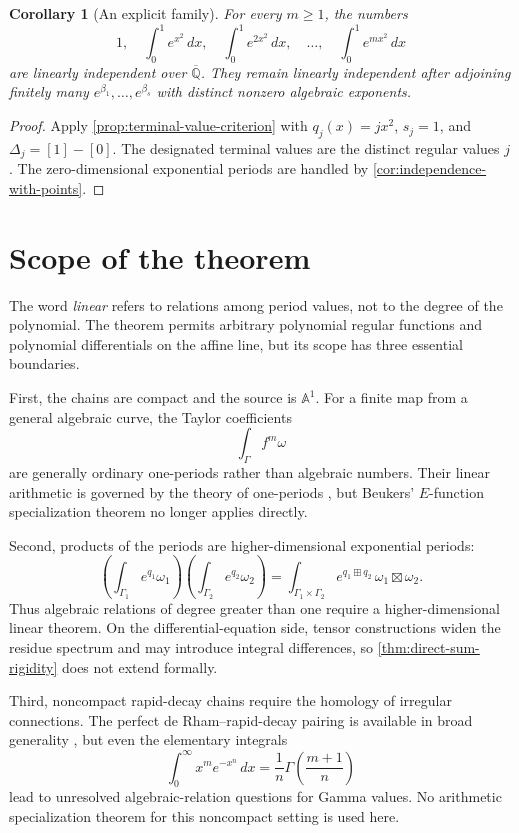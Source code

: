 \documentclass[11pt]{article}
\numberwithin{equation}{section}
\newtheorem{corollary}[corollary]{Corollary}
\theoremstyle{definition}
\theoremstyle{remark}
\newcommand{\Qbar}{\overline{\mathbb Q}}
\newcommand{\Aone}{\mathbb A^1}
\begin{document}
\begin{corollary}[An explicit family]
\label{cor:explicit-family}
For every $m\ge1$, the numbers
\[
  1,
  \quad
  \int_0^1e^{x^2}\,dx,
  \quad
  \int_0^1e^{2x^2}\,dx,
  \quad\ldots,\quad
  \int_0^1e^{mx^2}\,dx
\]
are linearly independent over $\Qbar$.  They remain linearly independent
after adjoining finitely many $e^{\beta_1},\ldots,e^{\beta_s}$ with
distinct nonzero algebraic exponents.
\end{corollary}

\begin{proof}
Apply \cref{prop:terminal-value-criterion} with
$q_j(x)=jx^2$, $s_j=1$, and $\Delta_j=[1]-[0]$.  The designated terminal
values are the distinct regular values $j$.  The zero-dimensional exponential periods are handled
by \cref{cor:independence-with-points}.
\end{proof}

\section{Scope of the theorem}
\label{sec:scope}

The word \emph{linear} refers to relations among period values, not to the
degree of the polynomial.  The theorem permits arbitrary polynomial
regular functions and polynomial differentials on the affine line, but its
scope has three essential boundaries.

First, the chains are compact and the source is $\Aone$.  For a finite map
from a general algebraic curve, the Taylor coefficients
\[
  \int_\Gamma f^m\omega
\]
are generally ordinary one-periods rather than algebraic numbers.  Their
linear arithmetic is governed by the theory of one-periods
\cite{HuberWustholz}, but Beukers' $E$-function specialization theorem no
longer applies directly.

Second, products of the periods are higher-dimensional exponential periods:
\[
  \left(\int_{\Gamma_1}e^{q_1}\omega_1\right)
  \left(\int_{\Gamma_2}e^{q_2}\omega_2\right)
  =\int_{\Gamma_1\times\Gamma_2}
     e^{q_1\boxplus q_2}\,\omega_1\boxtimes\omega_2.
\]
Thus algebraic relations of degree greater than one require a
higher-dimensional linear theorem.  On the differential-equation side,
tensor constructions widen the residue spectrum and may introduce integral
differences, so \cref{thm:direct-sum-rigidity} does not extend formally.

Third, noncompact rapid-decay chains require the homology of irregular
connections.  The perfect de Rham--rapid-decay pairing is available in broad
generality \cite{BlochEsnault,HienFlat}, but even the elementary integrals
\[
  \int_0^\infty x^m e^{-x^n}\,dx
  =\frac1n\Gamma\!\left(\frac{m+1}{n}\right)
\]
lead to unresolved algebraic-relation questions for Gamma values.  No
arithmetic specialization theorem for this noncompact setting is used here.
\end{document}

